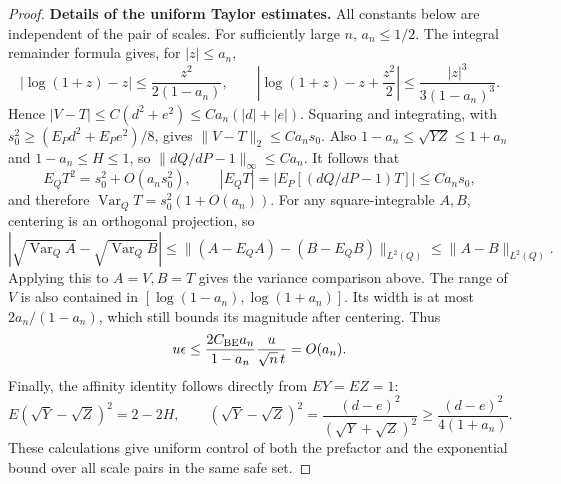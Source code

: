 \documentclass[a4paper,11pt]{article}
\theoremstyle{remark}
\begin{document}
\begin{proof}
\medskip\noindent\textbf{Details of the uniform Taylor estimates.}
All constants below are independent of the pair of scales. For sufficiently large $n$, $a_n\le1/2$.
The integral remainder formula gives, for $|z|\le a_n$,
\[
 |\log(1+z)-z|\le\frac{z^2}{2(1-a_n)},\qquad
 \left|\log(1+z)-z+\frac{z^2}{2}\right|
 \le\frac{|z|^3}{3(1-a_n)^3}.
\]
Hence $|V-T|\le C(d^2+e^2)\le Ca_n(|d|+|e|)$.
Squaring and integrating, with $s_0^2\ge(E_Pd^2+E_Pe^2)/8$, gives
$\|V-T\|_2\le Ca_ns_0$.
Also $1-a_n\le\sqrt{YZ}\le1+a_n$ and $1-a_n\le H\le1$, so
$\|dQ/dP-1\|_\infty\le Ca_n$.
It follows that
\[
 E_QT^2=s_0^2+O(a_ns_0^2),\qquad
 |E_QT|=|E_P[(dQ/dP-1)T]|\le Ca_ns_0,
\]
and therefore $\operatorname{Var}_QT=s_0^2(1+O(a_n))$.
For any square-integrable $A,B$, centering is an orthogonal projection, so
\[
 |\sqrt{\operatorname{Var}_QA}-\sqrt{\operatorname{Var}_QB}|
 \le\|(A-E_QA)-(B-E_QB)\|_{L^2(Q)}
 \le\|A-B\|_{L^2(Q)}.
\]
Applying this to $A=V,B=T$ gives the variance comparison above.
The range of $V$ is also contained in
$[\log(1-a_n),\log(1+a_n)]$. Its width is at most $2a_n/(1-a_n)$,
which still bounds its magnitude after centering. Thus
\[
 u\epsilon\le\frac{2C_{\rm BE}a_n}{1-a_n}\frac{u}{\sqrt n\,t}
 =O(a_n).
\]
Finally, the affinity identity follows directly from $EY=EZ=1$:
\[
 E(\sqrt Y-\sqrt Z)^2=2-2H,
 \qquad(\sqrt Y-\sqrt Z)^2
 =\frac{(d-e)^2}{(\sqrt Y+\sqrt Z)^2}
 \ge\frac{(d-e)^2}{4(1+a_n)}.
\]
These calculations give uniform control of both the prefactor and the exponential bound over all scale pairs in the same safe set.

\end{proof}
\end{document}
